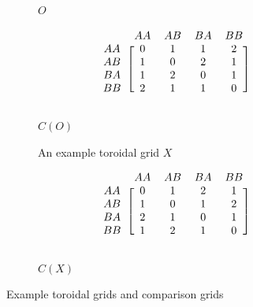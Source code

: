 \begin{figure}[htpb]
    \begin{subfigure}[b]{0.5\textwidth}
    \begin{center}
    \end{center}
    \caption{$O$}
    \end{subfigure}%
    \begin{subfigure}[b]{0.5\textwidth}
    \begin{center}
        \begin{align*}
            \begin{blockarray}{ccccc}
            &AA & AB & BA & BB \\
            \begin{block}{c[cccc]}
                AA&0&1&1&2\\
                AB&1&0&2&1\\
                BA&1&2&0&1\\
                BB&2&1&1&0\\
            \end{block}
            \end{blockarray}
        \end{align*}
    \end{center}
    \caption{$C(O)$}
    \label{fig:c_o}
    \end{subfigure}
    \begin{subfigure}[b]{0.5\textwidth}
    \begin{center}
    \end{center}
    \caption{An example toroidal grid $X$}
    \end{subfigure}%
    \begin{subfigure}[b]{0.5\textwidth}
    \begin{center}
        \begin{align*}
            \begin{blockarray}{ccccc}
            &AA & AB & BA & BB \\
            \begin{block}{c[cccc]}
                AA&0&1&2&1\\
                AB&1&0&1&2\\
                BA&2&1&0&1\\
                BB&1&2&1&0\\
            \end{block}
            \end{blockarray}
        \end{align*}
    \end{center}
    \vspace{-\baselineskip}
    \caption{$C(X)$}
    \end{subfigure}
    \caption{Example toroidal grids and comparison grids}
    \label{fig:comparisonExample}
\end{figure}


